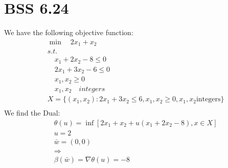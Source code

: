 \documentclass[12pt]{article}
\begin{document}
\section{BSS 6.24}
    We have the following objective function:\\
        \begin{align*}
            &\min \quad 2x_1 + x_2\\
            &s.t.\\
            &\quad x_1 + 2x_2 -8 \leq 0\\
            &\quad 2x_1 + 3x_2 - 6 \leq 0 \\
            &\quad x_1 , x_2 \geq 0\\
            &\quad x_1,x_2 \quad integers\\
            &X = \{(x_1,x_2): 2x_1 + 3x_2 \leq 6 , x_1, x_2 \geq 0, x_1, x_2 \text{integers} \}\\
        \end{align*}
    We find the Dual:\\
        \begin{align*}
            &\theta(u) = \inf [2x_1 + x_2 + u(x_1 + 2x_2 - 8), x \in X]\\
            &u=2\\
            &\bar w = (0,0)\\
            &\Rightarrow\\
            &\beta(\bar w) = \nabla \theta(u) = -8\\ 
        \end{align*} 
\end{document}
